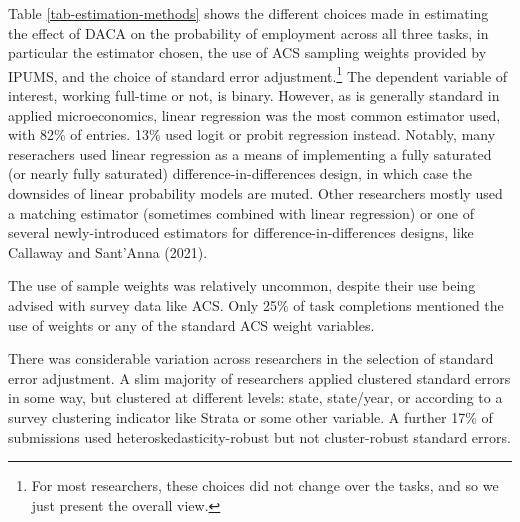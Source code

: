 \documentclass[
  letterpaper,
  DIV=11,
  numbers=noendperiod]{scrartcl}
\begin{document}
Table \ref{tab-estimation-methods} shows the different choices made in
estimating the effect of DACA on the probability of employment across
all three tasks, in particular the estimator chosen, the use of ACS
sampling weights provided by IPUMS, and the choice of standard error
adjustment.\footnote{For most researchers, these choices did not change
  over the tasks, and so we just present the overall view.} The
dependent variable of interest, working full-time or not, is binary.
However, as is generally standard in applied microeconomics, linear
regression was the most common estimator used, with 82\% of entries.
13\% used logit or probit regression instead. Notably, many reserachers
used linear regression as a means of implementing a fully saturated (or
nearly fully saturated) difference-in-differences design, in which case
the downsides of linear probability models are muted. Other researchers
mostly used a matching estimator (sometimes combined with linear
regression) or one of several newly-introduced estimators for
difference-in-differences designs, like Callaway and Sant'Anna (2021).

The use of sample weights was relatively uncommon, despite their use
being advised with survey data like ACS. Only 25\% of task completions
mentioned the use of weights or any of the standard ACS weight
variables.

There was considerable variation across researchers in the selection of
standard error adjustment. A slim majority of researchers applied
clustered standard errors in some way, but clustered at different
levels: state, state/year, or according to a survey clustering indicator
like Strata or some other variable. A further 17\% of submissions used
heteroskedasticity-robust but not cluster-robust standard errors.
\end{document}

